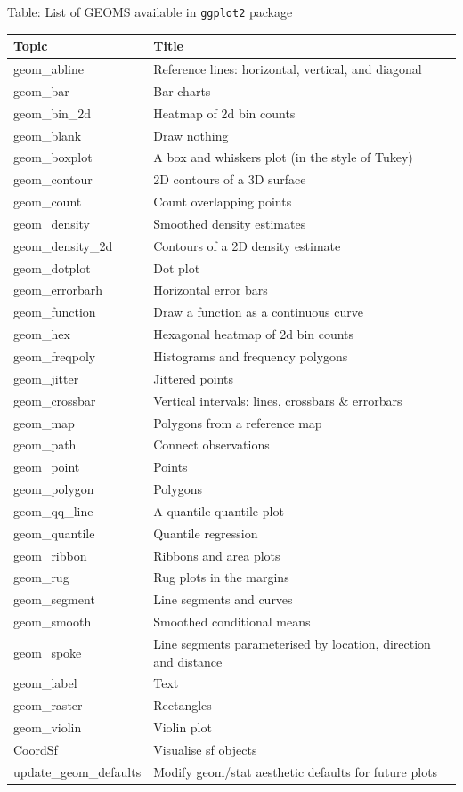 \documentclass[
]{book}
\begin{document}
Table: List of GEOMS available in \texttt{ggplot2} package

\begin{tabular}{l|l}
\hline
Topic & Title\\
\hline
geom\_abline & Reference lines: horizontal, vertical, and diagonal\\
\hline
geom\_bar & Bar charts\\
\hline
geom\_bin\_2d & Heatmap of 2d bin counts\\
\hline
geom\_blank & Draw nothing\\
\hline
geom\_boxplot & A box and whiskers plot (in the style of Tukey)\\
\hline
geom\_contour & 2D contours of a 3D surface\\
\hline
geom\_count & Count overlapping points\\
\hline
geom\_density & Smoothed density estimates\\
\hline
geom\_density\_2d & Contours of a 2D density estimate\\
\hline
geom\_dotplot & Dot plot\\
\hline
geom\_errorbarh & Horizontal error bars\\
\hline
geom\_function & Draw a function as a continuous curve\\
\hline
geom\_hex & Hexagonal heatmap of 2d bin counts\\
\hline
geom\_freqpoly & Histograms and frequency polygons\\
\hline
geom\_jitter & Jittered points\\
\hline
geom\_crossbar & Vertical intervals: lines, crossbars \& errorbars\\
\hline
geom\_map & Polygons from a reference map\\
\hline
geom\_path & Connect observations\\
\hline
geom\_point & Points\\
\hline
geom\_polygon & Polygons\\
\hline
geom\_qq\_line & A quantile-quantile plot\\
\hline
geom\_quantile & Quantile regression\\
\hline
geom\_ribbon & Ribbons and area plots\\
\hline
geom\_rug & Rug plots in the margins\\
\hline
geom\_segment & Line segments and curves\\
\hline
geom\_smooth & Smoothed conditional means\\
\hline
geom\_spoke & Line segments parameterised by location, direction and distance\\
\hline
geom\_label & Text\\
\hline
geom\_raster & Rectangles\\
\hline
geom\_violin & Violin plot\\
\hline
CoordSf & Visualise sf objects\\
\hline
update\_geom\_defaults & Modify geom/stat aesthetic defaults for future plots\\
\hline
\end{tabular}
\end{document}
